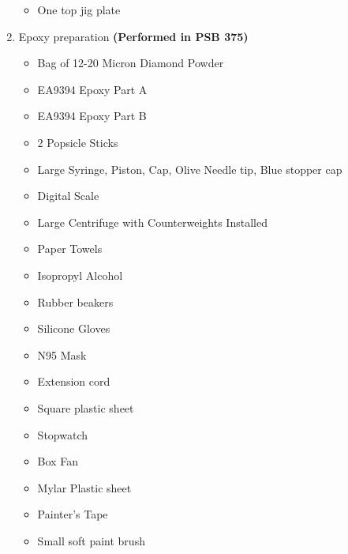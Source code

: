 \documentclass[12pt]{cornelltfpxsop}
\begin{document}
\begin{enumerate}
\begin{itemize}
        \item One top jig plate
    \end{itemize}
\item Epoxy preparation \textbf{(Performed in PSB 375)}
    \begin{itemize}
        \item Bag of 12-20 Micron Diamond Powder
        \item EA9394 Epoxy Part A
        \item EA9394 Epoxy Part B
        \item 2 Popsicle Sticks
        \item Large Syringe, Piston, Cap, Olive Needle tip, Blue stopper cap
        \item Digital Scale
        \item Large Centrifuge with Counterweights Installed
        \item Paper Towels
        \item Isopropyl Alcohol
        \item Rubber beakers
        \item Silicone Gloves
        \item N95 Mask
        \item Extension cord
        \item Square plastic sheet
        \item Stopwatch
        \item Box Fan
        \item Mylar Plastic sheet
        \item Painter's Tape
        \item Small soft paint brush
    \end{itemize}
\end{enumerate}
\end{document}
